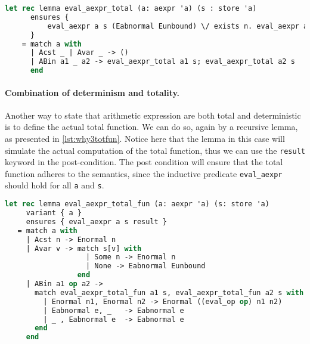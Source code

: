 \begin{lstlisting}[caption={Axiom of functional lemma},label={lst:why3tot},language=sml]
  let rec lemma eval_aexpr_total (a: aexpr 'a) (s : store 'a)
      ensures {
          eval_aexpr a s (Eabnormal Eunbound) \/ exists n. eval_aexpr a s (Enormal n)
      }
    = match a with
      | Acst _ | Avar _ -> ()
      | ABin a1 _ a2 -> eval_aexpr_total a1 s; eval_aexpr_total a2 s
      end
\end{lstlisting}

\paragraph{Combination of determinism and totality.}
Another way to state that arithmetic expression are both total and deterministic is to define the actual total function.
We can do so, again by a recursive lemma, as presented in \autoref{lst:why3totfun}. Notice here that the lemma in this case will simulate the actual
computation of the total function, thus we can use the \texttt{result} keyword in the post-condition.
The post condition will ensure that the total function adheres to the semantics, since the inductive predicate
\texttt{eval_aexpr} should hold for all \texttt{a} and \texttt{s}.

\begin{lstlisting}[caption={Lemma combining totality and determinism for arithmetic expressions},label={lst:why3totfun},language=sml]
let rec lemma eval_aexpr_total_fun (a: aexpr 'a) (s: store 'a)
     variant { a }
     ensures { eval_aexpr a s result }
   = match a with
     | Acst n -> Enormal n
     | Avar v -> match s[v] with
                   | Some n -> Enormal n
                   | None -> Eabnormal Eunbound
                 end
     | ABin a1 op a2 ->
       match eval_aexpr_total_fun a1 s, eval_aexpr_total_fun a2 s with
         | Enormal n1, Enormal n2 -> Enormal ((eval_op op) n1 n2)
         | Eabnormal e, _   -> Eabnormal e
         | _ , Eabnormal e  -> Eabnormal e
       end
     end
\end{lstlisting}
